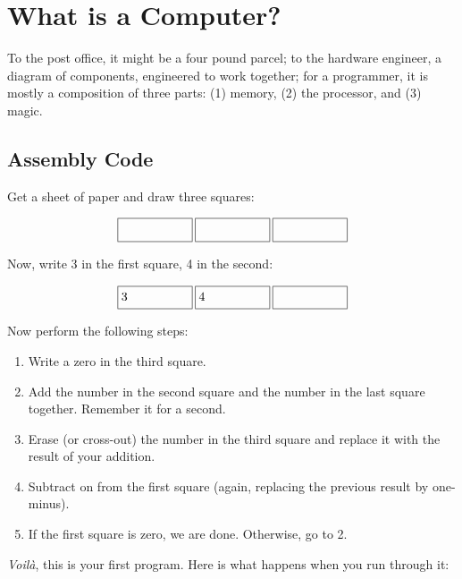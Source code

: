 \chapter{What is a Computer?}

To the post office, it might be a four pound parcel; to the hardware engineer,
a diagram of components, engineered to work together; for a programmer, it is
mostly a composition of three parts: (1) memory, (2) the processor, and (3)
magic.

\section{Assembly Code}

Get a sheet of paper and draw three squares:

\newcommand\dorect[1]{\framebox[6em]{\ensuremath{#1}\strut\hfill}}%
\newcommand\dostate[3]{\dorect{#1}\hspace{2pt}\dorect{#2}\hspace{2pt}\dorect{#3}}

\[
\dostate{}{}{}
\]

Now, write 3 in the first square, 4 in the second:


\[
\dostate{3}{4}{\strut}
\]

Now perform the following steps:

\begin{enumerate}
\item Write a zero in the third square.
\item Add the number in the second square and the number in the last square
together. Remember it for a second.
\item Erase (or cross-out) the number in the third square and replace it with
the result of your addition.
\item Subtract on from the first square (again, replacing the previous result
by one-minus).
\item If the first square is zero, we are done. Otherwise, go to 2.
\end{enumerate}

\emph{Voilà}, this is your first program. Here is what happens when you run through it:

